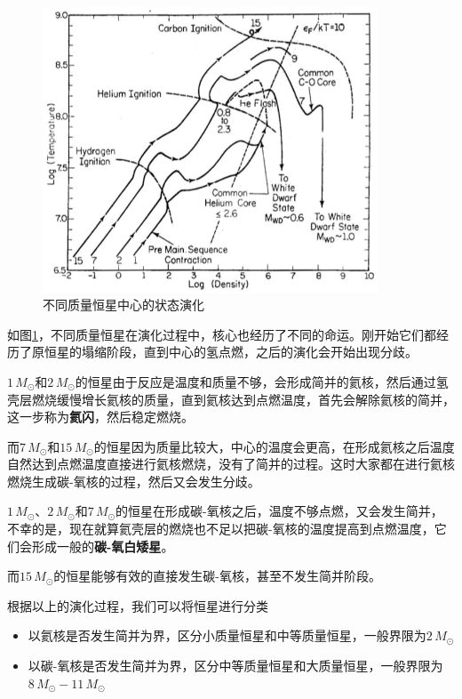 \begin{figure}[hbt]
  \centering
  \includegraphics[width=10cm]{chapters/13/center}
  \caption{不同质量恒星中心的状态演化}
  \label{fig:center}
\end{figure}

如图\ref{fig:center}，不同质量恒星在演化过程中，核心也经历了不同的命运。刚开始它们都经历了原恒星的塌缩阶段，直到中心的氢点燃，之后的演化会开始出现分歧。

$1\,M_\odot$和$2\,M_\odot$的恒星由于反应是温度和质量不够，会形成简并的氦核，然后通过氢壳层燃烧缓慢增长氦核的质量，直到氦核达到点燃温度，首先会解除氦核的简并，这一步称为\textbf{氦闪}，然后稳定燃烧。

而$7\,M_\odot$和$15\,M_\odot$的恒星因为质量比较大，中心的温度会更高，在形成氦核之后温度自然达到点燃温度直接进行氦核燃烧，没有了简并的过程。这时大家都在进行氦核燃烧生成碳-氧核的过程，然后又会发生分歧。

$1\,M_\odot$、$2\,M_\odot$和$7\,M_\odot$的恒星在形成碳-氧核之后，温度不够点燃，又会发生简并，不幸的是，现在就算氦壳层的燃烧也不足以把碳-氧核的温度提高到点燃温度，它们会形成一般的\textbf{碳-氧白矮星}。

而$15\,M_\odot$的恒星能够有效的直接发生碳-氧核，甚至不发生简并阶段。

根据以上的演化过程，我们可以将恒星进行分类
\begin{itemize}
  \item 以氦核是否发生简并为界，区分小质量恒星和中等质量恒星，一般界限为$2\,M_\odot$
  \item 以碳-氧核是否发生简并为界，区分中等质量恒星和大质量恒星，一般界限为$8\,M_\odot-11\,M_\odot$
\end{itemize}

